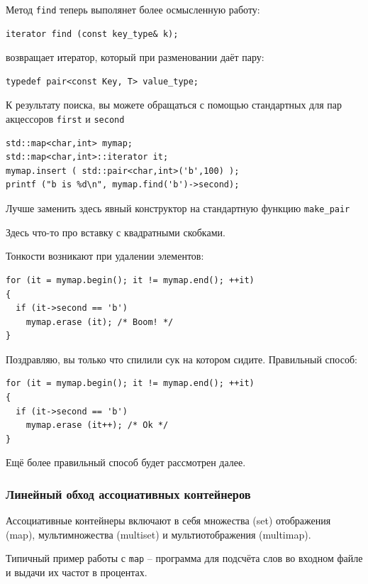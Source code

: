 \documentclass[a4paper,12pt,oneside]{article}
\begin{document}
Метод \lstinline!find! теперь выполянет более осмысленную работу:

\begin{lstlisting}
iterator find (const key_type& k);
\end{lstlisting}

возвращает итератор, который при разменовании даёт пару:

\begin{lstlisting}
typedef pair<const Key, T> value_type;
\end{lstlisting}

К результату поиска, вы можете обращаться с помощью стандартных для пар акцессоров \lstinline!first! и \lstinline!second!

\begin{lstlisting}
std::map<char,int> mymap;
std::map<char,int>::iterator it;
mymap.insert ( std::pair<char,int>('b',100) );
printf ("b is %d\n", mymap.find('b')->second);
\end{lstlisting}

Лучше заменить здесь явный конструктор на стандартную функцию \lstinline!make_pair!

Здесь что-то про вставку с квадратными скобками.

Тонкости возникают при удалении элементов:

\begin{lstlisting}
for (it = mymap.begin(); it != mymap.end(); ++it)
{
  if (it->second == 'b')
    mymap.erase (it); /* Boom! */
}
\end{lstlisting}

Поздравляю, вы только что спилили сук на котором сидите. Правильный способ:

\begin{lstlisting}
for (it = mymap.begin(); it != mymap.end(); ++it)
{
  if (it->second == 'b')
    mymap.erase (it++); /* Ok */
}
\end{lstlisting}

Ещё более правильный способ будет рассмотрен далее.

\subsubsection{Линейный обход ассоциативных контейнеров}

Ассоциативные контейнеры включают в себя множества (set) отображения (map), мультимножества (multiset) и мультиотображения (multimap).

Типичный пример работы с \lstinline!map! -- программа для подсчёта слов во входном файле и выдачи их частот в процентах.
\end{document}
